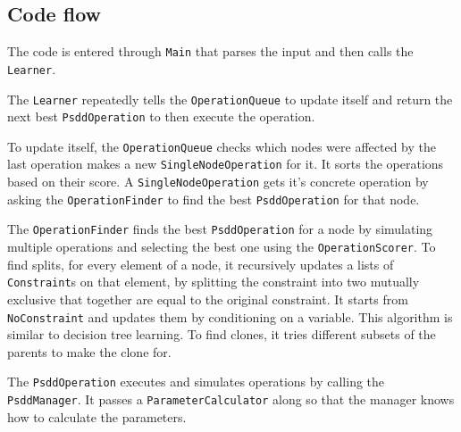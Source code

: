 \documentclass[a4paper,10pt]{article}
\begin{document}
\subsection{Code flow}

The code is entered through {\tt Main} that parses the input and then calls the {\tt Learner}.

The {\tt Learner} repeatedly tells the {\tt OperationQueue} to update itself and return the next best {\tt PsddOperation} to then execute the operation.

To update itself, the {\tt OperationQueue} checks which nodes were affected by the last operation makes a new {\tt SingleNodeOperation} for it. It sorts the operations based on their score. A {\tt SingleNodeOperation} gets it's concrete operation by asking the {\tt OperationFinder} to find the best {\tt PsddOperation} for that node.

The {\tt OperationFinder} finds the best {\tt PsddOperation} for a node by simulating multiple operations and selecting the best one using the {\tt OperationScorer}. To find splits, for every element of a node, it recursively updates a lists of {\tt Constraint}s on that element, by splitting the constraint into two mutually exclusive that together are equal to the original constraint. It starts from {\tt NoConstraint} and updates them by conditioning on a variable. This algorithm is similar to decision tree learning. To find clones, it tries different subsets of the parents to make the clone for.

The {\tt PsddOperation} executes and simulates operations by calling the {\tt PsddManager}. It passes a {\tt ParameterCalculator} along so that the manager knows how to calculate the parameters.
\end{document}
